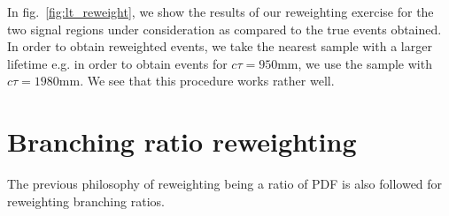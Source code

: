 \documentclass[prd,reprint,nofootinbib,notitlepage,aps,tightenlines,amsmath,amssymb,showpacs,superscriptaddress]{revtex4-1}
\begin{document}
In fig.~\ref{fig:lt_reweight}, we show the results of our reweighting exercise for the two signal regions under consideration as compared to the true events obtained. In order to obtain reweighted events, we take the nearest sample with a larger lifetime e.g. in order to obtain events for $c\tau = 950$mm, we use the sample with $c\tau = 1980$mm. We see that this procedure works rather well. 
\section{Branching ratio reweighting}
\label{sec:br}
The previous philosophy of reweighting being a ratio of PDF is also followed for reweighting branching ratios.
\end{document}
